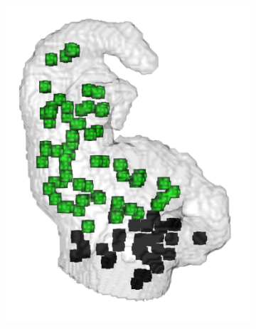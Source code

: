 \documentclass[review]{elsarticle}
\begin{document}
\begin{figure}[t]
\begin{subfigure}[b]{.18\linewidth}
    \caption{}
  \end{subfigure}%
  \begin{subfigure}[b]{.16\linewidth}
    \centering
    \includegraphics[width=\textwidth]{fig16_4.png}
    \caption{}
  \end{subfigure}%
  \begin{subfigure}[b]{.11\linewidth}
    \centering

\end{subfigure}
\end{figure}
\end{document}
